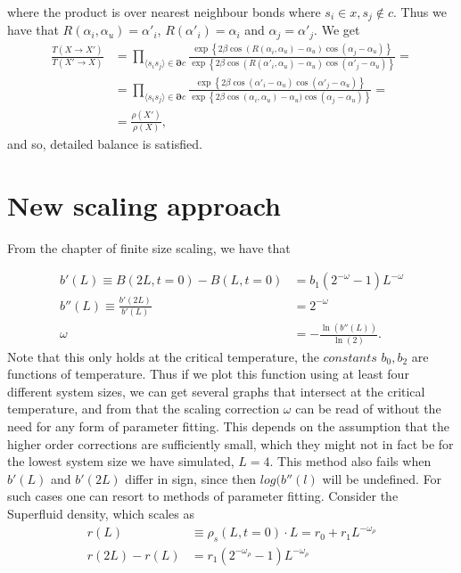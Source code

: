 where the product is over nearest neighbour bonds where $s_i \in x, s_j \notin c$.
Thus we have that $ R(\alpha_i,\alpha_u) = \alpha'_i $, $R(\alpha'_i) = \alpha_i$ and $\alpha_j = \alpha'_j$.
We get
\begin{align}
  \frac{T(X\rightarrow X')}{T(X'\rightarrow X)}&= \prod_{\langle s_i s_j \rangle \in \bm{\partial} c} \frac{ \exp\left\{2\beta\cos(R(\alpha_i,\alpha_u) - \alpha_u)\cos(\alpha_j - \alpha_u)\right\}}{ \exp\left\{2\beta\cos(R(\alpha'_i,\alpha_u) - \alpha_u)\cos(\alpha'_j -\alpha_u)\right\}} = \\
  &= \prod_{\langle s_i s_j \rangle \in \bm{\partial} c} \frac{ \exp\left\{2\beta\cos(\alpha'_i - \alpha_u)\cos(\alpha'_j - \alpha_u)\right\}}{ \exp\left\{2\beta\cos(\alpha_i,\alpha_u) - \alpha_u)\cos(\alpha_j -\alpha_u)\right\}} = \\
  &= \frac{\rho(X')}{\rho(X)},
\end{align}
and so, detailed balance is satisfied.

\section{New scaling approach}
From the chapter of finite size scaling, we have that

\begin{align}
  b'(L) \equiv B(2L,t=0) - B(L,t=0) &= b_1(2^{-\omega} -1)L^{-\omega}\\
  b''(L)\equiv \frac{b'(2L)}{b'(L)} &= 2^{-\omega}\\
  \omega &= -\frac{\ln(b''(L))}{\ln(2)}.
\end{align}
Note that this only holds at the critical temperature, the $\textit{constants}$ $b_0, b_2$ are functions of temperature. Thus if we plot this function using at least four different system sizes, we can get several graphs that intersect at the critical temperature, and from that the scaling correction $\omega$ can be read of without the need for any form of parameter fitting. This depends on the assumption that the higher order corrections are sufficiently small, which they might not in fact be for the lowest system size we have simulated, $L=4$. This method also fails when $b'(L)$ and $b'(2L)$ differ in sign, since then $log(b''(l)$ will be undefined.
For such cases one can resort to methods of parameter fitting.
Consider the Superfluid density, which scales as 
\begin{align}
  r(L)&\equiv \rho_s(L,t=0) \cdot L = r_0 + r_1L^{-\omega_\rho}\\
  r(2L) - r(L) &= r_1(2^{-\omega_\rho} -1)L^{-\omega_\rho}
\end{align}



